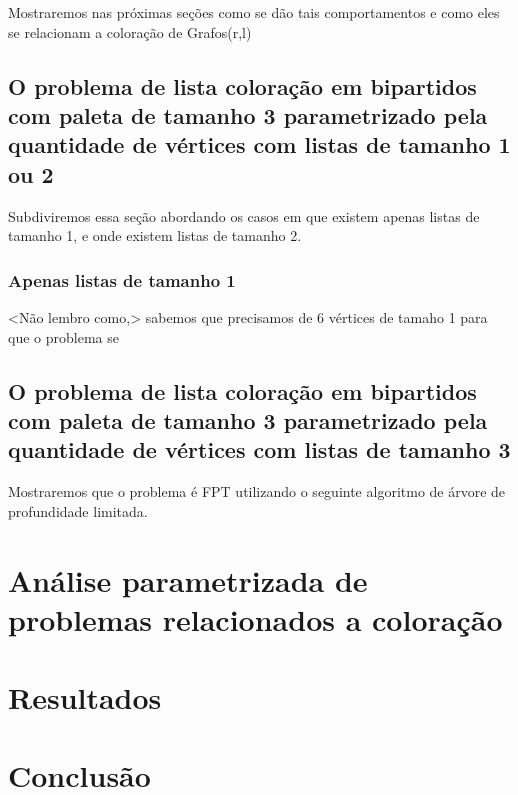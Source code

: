 \documentclass[a4paper,oneside,12pt]{book}
\begin{document}
Mostraremos nas próximas seções como se dão tais comportamentos e como eles se relacionam a coloração de Grafos(r,l)
\section{O problema de lista coloração em bipartidos com paleta de tamanho 3 parametrizado pela quantidade de vértices com listas de tamanho 1 ou 2}
Subdiviremos essa seção abordando os casos em que existem apenas listas de tamanho 1, e onde existem listas de tamanho 2.
\subsection{Apenas listas de tamanho 1}
 <Não lembro como,> sabemos que precisamos de 6 vértices de tamaho 1 para que o problema se 
\section{O problema de lista coloração em bipartidos com paleta de tamanho 3 parametrizado pela quantidade de vértices com listas de tamanho 3}
Mostraremos que o problema é FPT utilizando o seguinte algoritmo de árvore de profundidade limitada.
\chapter{Análise parametrizada de problemas relacionados a coloração}
\chapter{Resultados}
\chapter{Conclusão}
\cleardoublepage
{}

%

\end{document}
